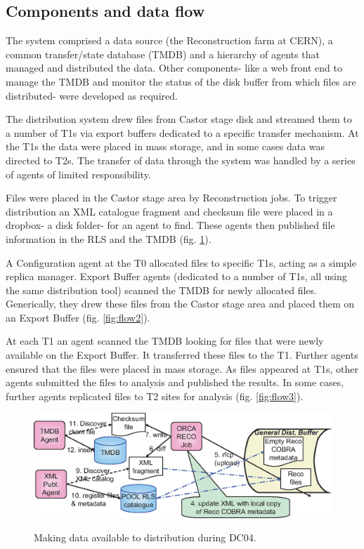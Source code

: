 \documentclass{cmspaper}
\begin{document}
\subsection{Components and data flow}
The system comprised a data source (the Reconstruction farm at CERN),
a common transfer/state database (TMDB) and a hierarchy of agents that
managed and distributed the data. Other components- like a web front
end to manage the TMDB and monitor the status of the disk buffer from
which files are distributed- were developed as required.

The distribution system drew files from Castor stage disk and streamed
them to a number of T1s via export buffers dedicated to a specific
transfer mechanism. At the T1s the data were placed in mass storage,
and in some cases data was directed to T2s. The transfer of data
through the system was handled by a series of agents of limited
responsibility.

Files were placed in the Castor stage area by Reconstruction jobs. To
trigger distribution an XML catalogue fragment and checksum file were
placed in a dropbox- a disk folder- for an agent to find. These agents
then published file information in the RLS and the TMDB
(fig. \ref{fig:flow1}).

A Configuration agent at the T0 allocated files to specific T1s,
acting as a simple replica manager. Export Buffer agents (dedicated to
a number of T1s, all using the same distribution tool) scanned the
TMDB for newly allocated files. Generically, they drew these files
from the Castor stage area and placed them on an Export Buffer
(fig. \ref{fig:flow2}).

At each T1 an agent scanned the TMDB looking for files that were newly
available on the Export Buffer. It transferred these files to the
T1. Further agents ensured that the files were placed in mass
storage. As files appeared at T1s, other agents submitted the files to
analysis and published the results. In some cases, further agents
replicated files to T2 sites for analysis (fig. \ref{fig:flow3}).

\begin{figure}[tbp]
\centering \includegraphics[angle = 90]{T0-flow.eps}
\label{fig:flow1}
\caption{Making data available to distribution during DC04.}
\end{figure}
\end{document}

